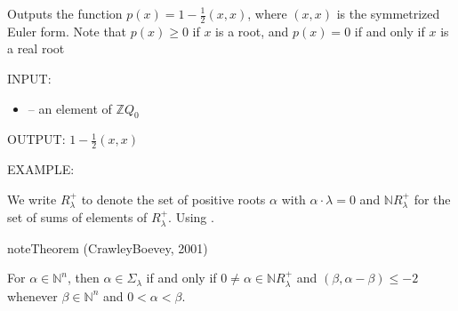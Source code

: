 \documentclass[letterpaper,10pt,english]{sphinxmanual}
\begin{document}
\begin{fulllineitems}
\label{\detokenize{index:quivercombinatorics.quivercombinatorics.Quiver.p_function}}
\pysigstartsignatures
\pysiglinewithargsret
{}
{}
{}
\pysigstopsignatures
\sphinxAtStartPar
Outputs the function \(p(x) = 1 - \frac{1}{2}(x, x)\), where \((x, x)\) is the symmetrized Euler form. Note that \(p(x)\geq 0\) if \(x\) is a root, and \(p(x) = 0\) if and only if \(x\) is a real root

\sphinxAtStartPar
INPUT:
\begin{itemize}
\item {} 
\sphinxAtStartPar
{} – an element of \(\mathbb{Z}Q_0\)

\end{itemize}

\sphinxAtStartPar
OUTPUT: \(1 - \frac{1}{2}(x, x)\)

\sphinxAtStartPar
EXAMPLE:

\begin{sphinxVerbatim}[commandchars=\\\{\}]
  
   \PYG{p}{[}\PYG{p}{[} \PYG{p}{]} \PYG{p}{[} \PYG{p}{]}\PYG{p}{]}
  
\end{sphinxVerbatim}

\end{fulllineitems}


\sphinxAtStartPar
We write \(R_\lambda^+\) to denote the set of positive roots \(\alpha\) with \(\alpha\cdot\lambda=0\) and \(\mathbb{N}R_\lambda^+\) for the set of sums of elements of \(R_\lambda^+\). Using .

\begin{sphinxadmonition}{note}{Theorem (Crawley\sphinxhyphen{}Boevey, 2001)}

\sphinxAtStartPar
For \(\alpha\in\mathbb{N}^n\), then \(\alpha\in\Sigma_\lambda\) if and only if \(0\neq\alpha\in\mathbb{N}R_\lambda^+\) and \((\beta,\alpha-\beta)\leq -2\) whenever \(\beta\in\mathbb{N}^n\) and \(0<\alpha<\beta\).
\end{sphinxadmonition}
\end{document}
